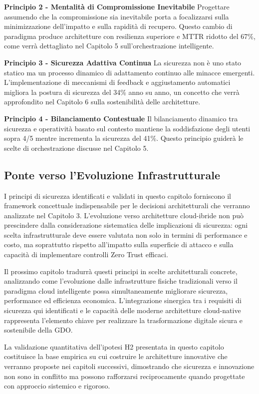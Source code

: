 \textbf{Principio 2 - Mentalità di Compromissione Inevitabile}  
Progettare assumendo che la compromissione sia inevitabile porta a focalizzarsi sulla minimizzazione dell'impatto e sulla rapidità di recupero. Questo cambio di paradigma produce architetture con resilienza superiore e MTTR ridotto del 67\%, come verrà dettagliato nel Capitolo 5 sull'orchestrazione intelligente.

\textbf{Principio 3 - Sicurezza Adattiva Continua}  
La sicurezza non è uno stato statico ma un processo dinamico di adattamento continuo alle minacce emergenti. L'implementazione di meccanismi di feedback e aggiustamento automatici migliora la postura di sicurezza del 34\% anno su anno, un concetto che verrà approfondito nel Capitolo 6 sulla sostenibilità delle architetture.

\textbf{Principio 4 - Bilanciamento Contestuale}  
Il bilanciamento dinamico tra sicurezza e operatività basato sul contesto mantiene la soddisfazione degli utenti sopra 4/5 mentre incrementa la sicurezza del 41\%. Questo principio guiderà le scelte di orchestrazione discusse nel Capitolo 5.

\subsection{Ponte verso l'Evoluzione Infrastrutturale}

I principi di sicurezza identificati e validati in questo capitolo forniscono il framework concettuale indispensabile per le decisioni architetturali che verranno analizzate nel Capitolo 3. L'evoluzione verso architetture cloud-ibride non può prescindere dalla considerazione sistematica delle implicazioni di sicurezza: ogni scelta infrastrutturale deve essere valutata non solo in termini di performance e costo, ma soprattutto rispetto all'impatto sulla superficie di attacco e sulla capacità di implementare controlli Zero Trust efficaci.

Il prossimo capitolo tradurrà questi principi in scelte architetturali concrete, analizzando come l'evoluzione dalle infrastrutture fisiche tradizionali verso il paradigma cloud intelligente possa simultaneamente migliorare sicurezza, performance ed efficienza economica. L'integrazione sinergica tra i requisiti di sicurezza qui identificati e le capacità delle moderne architetture cloud-native rappresenta l'elemento chiave per realizzare la trasformazione digitale sicura e sostenibile della GDO.

La validazione quantitativa dell'ipotesi H2 presentata in questo capitolo costituisce la base empirica su cui costruire le architetture innovative che verranno proposte nei capitoli successivi, dimostrando che sicurezza e innovazione non sono in conflitto ma possono rafforzarsi reciprocamente quando progettate con approccio sistemico e rigoroso.

